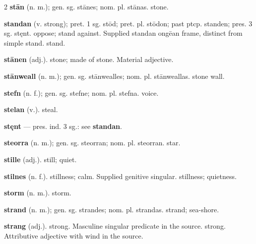 \begin{multicols*}{2}
\textbf{stān} (n. m.); gen. sg. stānes; nom. pl. stānas. stone.\par
\textbf{standan} (v. strong); pret. 1 sg. stōd; pret. pl. stōdon; past ptcp. standen; pres. 3 sg. stęnt. oppose; stand against. Supplied standan ongēan frame, distinct from simple stand. stand.\par
\textbf{stānen} (adj.). stone; made of stone. Material adjective.\par
\textbf{stānweall} (n. m.); gen. sg. stānwealles; nom. pl. stānweallas. stone wall.\par
\textbf{stefn} (n. f.); gen. sg. stefne; nom. pl. stefna. voice.\par
\textbf{stelan} (v.). steal.\par
\textbf{stęnt} — pres. ind. 3 sg.: see \textbf{standan}.\par
\textbf{steorra} (n. m.); gen. sg. steorran; nom. pl. steorran. star.\par
\textbf{stille} (adj.). still; quiet.\par
\textbf{stilnes} (n. f.). stillness; calm. Supplied genitive singular. stillness; quietness.\par
\textbf{storm} (n. m.). storm.\par
\textbf{strand} (n. m.); gen. sg. strandes; nom. pl. strandas. strand; sea-shore.\par
\textbf{strang} (adj.). strong. Masculine singular predicate in the source. strong. Attributive adjective with wind in the source.\par

\end{multicols*}
